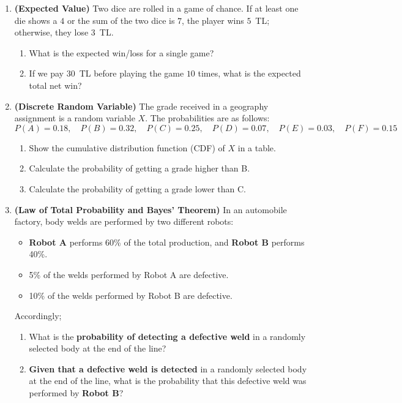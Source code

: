 \documentclass[12pt,a4paper]{article}
\begin{document}
\begin{enumerate}



\item \textbf{(Expected Value)} Two dice are rolled in a game of chance. If at least one die shows a $4$ or the sum of the two dice is $7$, the player wins $5$~TL; otherwise, they lose $3$~TL.
\begin{enumerate}
\item What is the expected win/loss for a single game?
\item If we pay $30$~TL before playing the game $10$ times, what is the expected total net win?
\end{enumerate}

\vspace{0.5cm}

\item \textbf{(Discrete Random Variable)} The grade received in a geography assignment is a random variable $X$. The probabilities are as follows:
\[
P(A)=0.18,\quad 
P(B)=0.32,\quad 
P(C)=0.25,\quad 
P(D)=0.07,\quad 
P(E)=0.03,\quad 
P(F)=0.15
\]
\begin{enumerate}
\item Show the cumulative distribution function (CDF) of $X$ in a table.
\item Calculate the probability of getting a grade higher than B.
\item Calculate the probability of getting a grade lower than C.
\end{enumerate}

\vspace{0.5cm}

\item \textbf{(Law of Total Probability and Bayes' Theorem)} In an automobile factory, body welds are performed by two different robots:
\begin{itemize}
\item \textbf{Robot A} performs 60\% of the total production, and \textbf{Robot B} performs 40\%.
\item 5\% of the welds performed by Robot A are defective.
\item 10\% of the welds performed by Robot B are defective.
\end{itemize}
Accordingly;
\begin{enumerate}
\item What is the \textbf{probability of detecting a defective weld} in a randomly selected body at the end of the line?
\item \textbf{Given that a defective weld is detected} in a randomly selected body at the end of the line, what is the probability that this defective weld was performed by \textbf{Robot B}?
\end{enumerate}


\end{enumerate}
\end{document}
